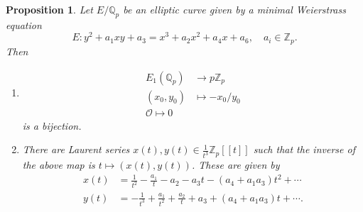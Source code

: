 \documentclass[a4paper]{article}
\newtheorem{proposition}[theorem]{Proposition}
\theoremstyle{definition}
\newcommand{\series}[2]{#1[\![#2]\!]}
\renewcommand{\O}{\mathcal{O}}
\newcommand{\Z}{\mathbb{Z}}
\newcommand{\Q}{\mathbb{Q}}
\begin{document}
\begin{proposition}
    Let $E/\Q_p$ be an elliptic curve given by a minimal Weierstrass equation
    \begin{equation*}
        E:y^2+a_1xy+a_3=x^3+a_2x^2+a_4x+a_6,\quad a_i\in\Z_p.
    \end{equation*}
    Then
    \begin{enumerate}[label=(\roman*)]
        \item
            \begin{align*}
                E_1(\Q_p)&\to p\Z_p \\
                (x_0,y_0)&\mapsto -x_0/y_0 \\
                \O\mapsto0
            \end{align*}
            is a bijection.

    \item There are Laurent series $x(t),y(t)\in\frac{1}{t^3}\series{\Z_p}{t}$
        such that the inverse of the above map is $t\mapsto(x(t),y(t))$. These
        are given by
        \begin{align*}
            x(t) &= \frac{1}{t^2} - \frac{a_1}{t} - a_2 - a_3t - (a_4+a_1a_3)t^2
                + \cdots \\
            y(t) &= -\frac{1}{t^3} + \frac{a_1}{t^2} + \frac{a_2}{t} + a_3
                + (a_4+a_1a_3)t + \cdots.
        \end{align*}
    \end{enumerate}
\end{proposition}
\end{document}
